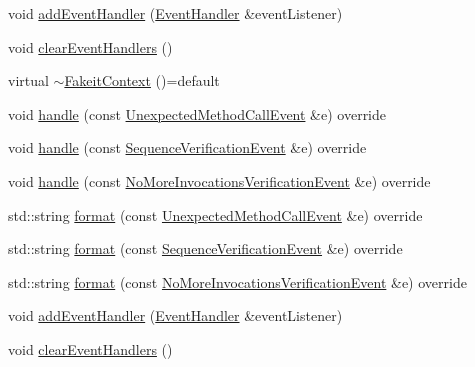 \begin{DoxyCompactItemize}
\item 
void \mbox{\hyperlink{structfakeit_1_1FakeitContext_a176ad0df1fcb2758648f2c9b6c8fdd0d}{add\+Event\+Handler}} (\mbox{\hyperlink{structfakeit_1_1EventHandler}{Event\+Handler}} \&event\+Listener)
\item 
void \mbox{\hyperlink{structfakeit_1_1FakeitContext_a65960b8d910f35fa5c3f596f693e5c17}{clear\+Event\+Handlers}} ()
\item 
virtual \mbox{\hyperlink{structfakeit_1_1FakeitContext_adfad726870dfba97246a9ddfddd3a3d5}{$\sim$\+Fakeit\+Context}} ()=default
\item 
void \mbox{\hyperlink{structfakeit_1_1FakeitContext_ac39067234f37a88f6c19440df0bc1b32}{handle}} (const \mbox{\hyperlink{structfakeit_1_1UnexpectedMethodCallEvent}{Unexpected\+Method\+Call\+Event}} \&e) override
\item 
void \mbox{\hyperlink{structfakeit_1_1FakeitContext_a6b77f1360c9f8f4165e1152173789d6e}{handle}} (const \mbox{\hyperlink{structfakeit_1_1SequenceVerificationEvent}{Sequence\+Verification\+Event}} \&e) override
\item 
void \mbox{\hyperlink{structfakeit_1_1FakeitContext_a09e2d757900d3c49a1b17694fa0395f1}{handle}} (const \mbox{\hyperlink{structfakeit_1_1NoMoreInvocationsVerificationEvent}{No\+More\+Invocations\+Verification\+Event}} \&e) override
\item 
std\+::string \mbox{\hyperlink{structfakeit_1_1FakeitContext_a4da398d63e45c922606bbd5aaff30f6e}{format}} (const \mbox{\hyperlink{structfakeit_1_1UnexpectedMethodCallEvent}{Unexpected\+Method\+Call\+Event}} \&e) override
\item 
std\+::string \mbox{\hyperlink{structfakeit_1_1FakeitContext_af163c4c51929ef14c1c5529f2f42c40b}{format}} (const \mbox{\hyperlink{structfakeit_1_1SequenceVerificationEvent}{Sequence\+Verification\+Event}} \&e) override
\item 
std\+::string \mbox{\hyperlink{structfakeit_1_1FakeitContext_a49fae6e849a57fff6906a1a313fb4267}{format}} (const \mbox{\hyperlink{structfakeit_1_1NoMoreInvocationsVerificationEvent}{No\+More\+Invocations\+Verification\+Event}} \&e) override
\item 
void \mbox{\hyperlink{structfakeit_1_1FakeitContext_a176ad0df1fcb2758648f2c9b6c8fdd0d}{add\+Event\+Handler}} (\mbox{\hyperlink{structfakeit_1_1EventHandler}{Event\+Handler}} \&event\+Listener)
\item 
void \mbox{\hyperlink{structfakeit_1_1FakeitContext_a65960b8d910f35fa5c3f596f693e5c17}{clear\+Event\+Handlers}} ()
\item 

\end{DoxyCompactItemize}
